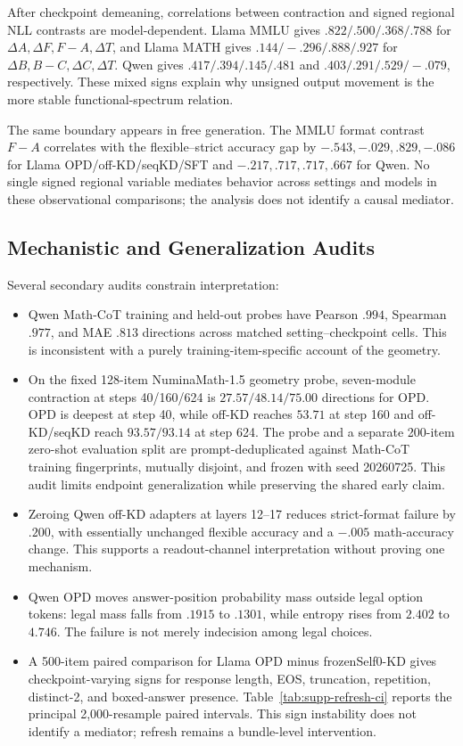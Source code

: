 \documentclass[letterpaper]{article} %
\begin{document}
After checkpoint demeaning, correlations between contraction and signed regional NLL
contrasts are model-dependent. Llama MMLU gives
$.822/.500/.368/.788$ for $\Delta A,\Delta F,F-A,\Delta T$, and Llama MATH gives
$.144/-.296/.888/.927$ for $\Delta B,B-C,\Delta C,\Delta T$. Qwen gives
$.417/.394/.145/.481$ and $.403/.291/.529/-.079$, respectively. These mixed signs
explain why unsigned output movement is the more stable functional-spectrum relation.

The same boundary appears in free generation. The MMLU format contrast $F-A$ correlates
with the flexible--strict accuracy gap by
$-.543,-.029,.829,-.086$ for Llama OPD/off-KD/seqKD/SFT and
$-.217,.717,.717,.667$ for Qwen. No single signed regional variable mediates behavior
across settings and models in these observational comparisons; the analysis does not
identify a causal mediator.

\subsection{Mechanistic and Generalization Audits}

Several secondary audits constrain interpretation:
\begin{itemize}
    \item Qwen Math-CoT training and held-out probes have Pearson $.994$, Spearman $.977$,
    and MAE $.813$ directions across matched setting--checkpoint cells. This is
    inconsistent with a purely training-item-specific account of the geometry.
    \item On the fixed 128-item NuminaMath-1.5 geometry probe, seven-module contraction
    at steps 40/160/624 is $27.57/48.14/75.00$ directions for OPD. OPD is deepest at
    step 40, while off-KD reaches $53.71$ at step 160 and off-KD/seqKD reach
    $93.57/93.14$ at step 624. The probe and a separate 200-item zero-shot evaluation
    split are prompt-deduplicated against Math-CoT training fingerprints, mutually
    disjoint, and frozen with seed 20260725. This audit limits endpoint generalization
    while preserving the shared early claim.
    \item Zeroing Qwen off-KD adapters at layers 12--17 reduces strict-format failure by
    $.200$, with essentially unchanged flexible accuracy and a $-.005$ math-accuracy
    change. This supports a readout-channel interpretation without proving one mechanism.
    \item Qwen OPD moves answer-position probability mass outside legal option tokens:
    legal mass falls from $.1915$ to $.1301$, while entropy rises from $2.402$ to $4.746$.
    The failure is not merely indecision among legal choices.
    \item A 500-item paired comparison for Llama OPD minus frozenSelf0-KD gives
    checkpoint-varying signs for response length, EOS, truncation, repetition,
    distinct-2, and boxed-answer presence. Table~\ref{tab:supp-refresh-ci} reports the
    principal 2,000-resample paired intervals. This sign instability does not identify a
    mediator; refresh remains a bundle-level intervention.
\end{itemize}
\end{document}
